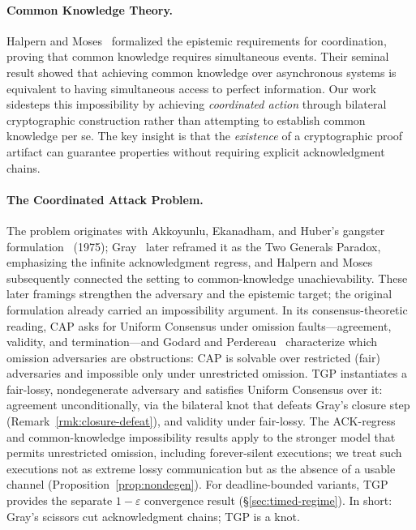 
\paragraph{Common Knowledge Theory.}
Halpern and Moses~\cite{halpern1990knowledge} formalized the epistemic requirements for coordination, proving that common knowledge requires simultaneous events. Their seminal result showed that achieving common knowledge over asynchronous systems is equivalent to having simultaneous access to perfect information. Our work sidesteps this impossibility by achieving \emph{coordinated action} through bilateral cryptographic construction rather than attempting to establish common knowledge per se. The key insight is that the \emph{existence} of a cryptographic proof artifact can guarantee properties without requiring explicit acknowledgment chains.

\paragraph{The Coordinated Attack Problem.}
The problem originates with Akkoyunlu, Ekanadham, and Huber's gangster formulation~\cite{akkoyunlu1975some} (1975); Gray~\cite{gray1978notes} later reframed it as the Two Generals Paradox, emphasizing the infinite acknowledgment regress, and Halpern and Moses~\cite{halpern1990knowledge} subsequently connected the setting to common-knowledge unachievability. These later framings strengthen the adversary and the epistemic target; the original formulation already carried an impossibility argument. In its consensus-theoretic reading, CAP asks for Uniform Consensus under omission faults---agreement, validity, and termination---and Godard and Perdereau~\cite{godard2021coordinated} characterize which omission adversaries are obstructions: CAP is solvable over restricted (fair) adversaries and impossible only under unrestricted omission. TGP instantiates a fair-lossy, nondegenerate adversary and satisfies Uniform Consensus over it: agreement unconditionally, via the bilateral knot that defeats Gray's closure step (Remark~\ref{rmk:closure-defeat}), and validity under fair-lossy. The ACK-regress and common-knowledge impossibility results apply to the stronger model that permits unrestricted omission, including forever-silent executions; we treat such executions not as extreme lossy communication but as the absence of a usable channel (Proposition~\ref{prop:nondegen}). For deadline-bounded variants, TGP provides the separate $1-\varepsilon$ convergence result (\S\ref{sec:timed-regime}). In short: Gray's scissors cut acknowledgment chains; TGP is a knot.


